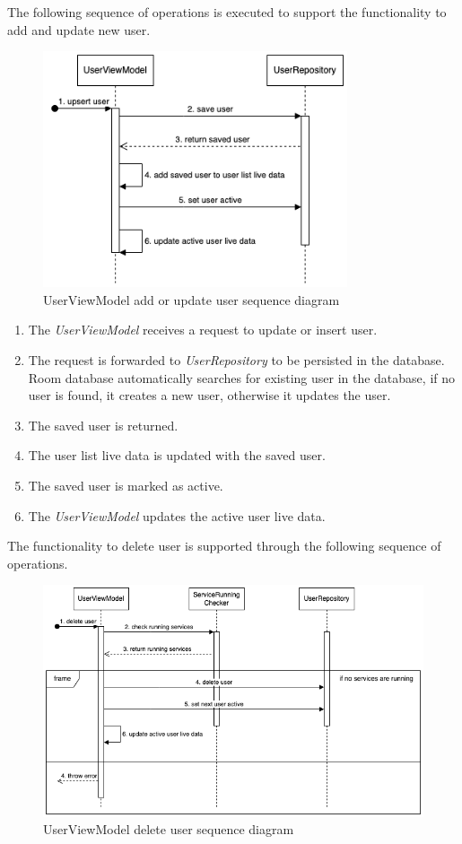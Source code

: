 The following sequence of operations is executed to support the functionality to add and update new user.
\begin{figure}[H]
    \centering
    \includegraphics[width=0.8\textwidth]{diagrams/upsert-user-vm.drawio.png}
    \caption{UserViewModel add or update user sequence diagram}
    \label{fig:userviewmodel_upsertuser}
\end{figure}

\begin{enumerate}
    \item The \emph{UserViewModel} receives a request to update or insert user.
    \item The request is forwarded to \emph{UserRepository} to be persisted in the database. Room database automatically searches for existing user in the database, if no user is found, it creates a new user, otherwise it updates the user.
    \item The saved user is returned.
    \item The user list live data is updated with the saved user.
    \item The saved user is marked as active.
    \item The \emph{UserViewModel} updates the active user live data.
\end{enumerate}

The functionality to delete user is supported through the following sequence of operations.
\begin{figure}[H]
    \centering
    \includegraphics[width=1\textwidth]{diagrams/delete-user-vm.drawio.png}
    \caption{UserViewModel delete user sequence diagram}
    \label{fig:userviewmodel_deleteuser}
\end{figure}

